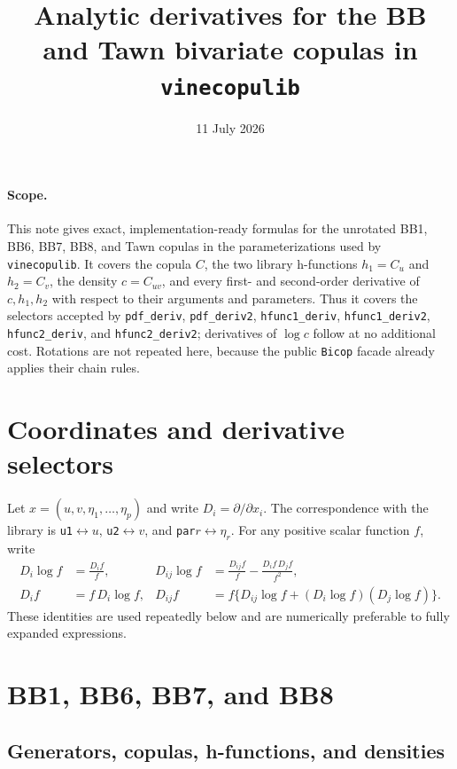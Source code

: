 \documentclass[10pt]{article}
\title{Analytic derivatives for the BB and Tawn bivariate copulas in \texttt{vinecopulib}}
\author{}
\date{11 July 2026}
\begin{document}
\maketitle
\vspace{-2.2em}

\paragraph{Scope.}
This note gives exact, implementation-ready formulas for the unrotated BB1, BB6,
BB7, BB8, and Tawn copulas in the parameterizations used by
\texttt{vinecopulib}.  It covers the copula $C$, the two library h-functions
$h_1=C_u$ and $h_2=C_v$, the density $c=C_{uv}$, and every first- and
second-order derivative of $c,h_1,h_2$ with respect to their arguments and
parameters.  Thus it covers the selectors accepted by
\texttt{pdf\_deriv}, \texttt{pdf\_deriv2},
\texttt{hfunc1\_deriv}, \texttt{hfunc1\_deriv2},
\texttt{hfunc2\_deriv}, and \texttt{hfunc2\_deriv2}; derivatives of
$\log c$ follow at no additional cost.  Rotations are not repeated here,
because the public \texttt{Bicop} facade already applies their chain rules.

\section{Coordinates and derivative selectors}

Let
$ x=(u,v,\eta_1,\ldots,\eta_p) $ and write $D_i=\partial/\partial x_i$.
The correspondence with the library is
\texttt{u1}$\leftrightarrow u$, \texttt{u2}$\leftrightarrow v$, and
\texttt{par}$r\leftrightarrow\eta_r$.  For any positive scalar function $f$,
write
\begin{align*}
D_i\log f &= \frac{D_i f}{f},
&
D_{ij}\log f &= \frac{D_{ij}f}{f}-\frac{D_i f\,D_j f}{f^2},\\
D_i f &= f\,D_i\log f,
&
D_{ij}f &= f\{D_{ij}\log f+(D_i\log f)(D_j\log f)\}.
\end{align*}
These identities are used repeatedly below and are numerically preferable to
fully expanded expressions.

\section{BB1, BB6, BB7, and BB8}

\subsection{Generators, copulas, h-functions, and densities}
\end{document}
